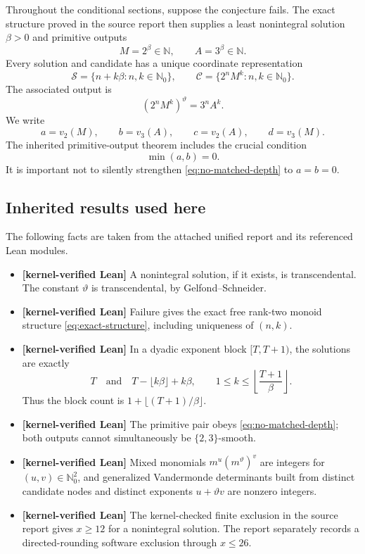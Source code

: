 \documentclass[11pt,oneside]{article}
\theoremstyle{definition}
\theoremstyle{remark}
\newcommand{\N}{\mathbb N}
\newcommand{\Nzero}{\mathbb N_0}
\newcommand{\Sol}{\mathcal S}
\newcommand{\Cand}{\mathcal C}
\newcommand{\statuslean}{\textcolor{leanblue}{\textbf{[kernel-verified Lean]}}}
\begin{document}
Throughout the conditional sections, suppose the conjecture fails.  The exact structure
proved in the source report then supplies a least nonintegral solution $\beta>0$ and primitive
outputs
\[
  M=2^\beta\in\N,
  \qquad
  A=3^\beta\in\N.
\]
Every solution and candidate has a unique coordinate representation
\begin{equation}\label{eq:exact-structure}
  \Sol=\{n+k\beta:n,k\in\Nzero\},
  \qquad
  \Cand=\{2^nM^k:n,k\in\Nzero\}.
\end{equation}
The associated output is
\[
  (2^nM^k)^\vartheta=3^nA^k.
\]
We write
\[
  a=v_2(M),\qquad b=v_3(A),\qquad c=v_2(A),\qquad d=v_3(M).
\]
The inherited primitive-output theorem includes the crucial condition
\begin{equation}\label{eq:no-matched-depth}
  \min(a,b)=0.
\end{equation}
It is important not to silently strengthen \eqref{eq:no-matched-depth} to $a=b=0$.

\subsection{Inherited results used here}

The following facts are taken from the attached unified report and its referenced Lean
modules.

\begin{itemize}
\item \statuslean{} A nonintegral solution, if it exists, is transcendental.  The constant
      $\vartheta$ is transcendental, by Gelfond--Schneider.
\item \statuslean{} Failure gives the exact free rank-two monoid structure
      \eqref{eq:exact-structure}, including uniqueness of $(n,k)$.
\item \statuslean{} In a dyadic exponent block $[T,T+1)$, the solutions are exactly
      \[
        T
        \quad\text{and}\quad
        T-\lfloor k\beta\rfloor+k\beta,
        \qquad 1\le k\le\left\lfloor\frac{T+1}{\beta}\right\rfloor.
      \]
      Thus the block count is $1+\lfloor(T+1)/\beta\rfloor$.
\item \statuslean{} The primitive pair obeys \eqref{eq:no-matched-depth}; both outputs cannot
      simultaneously be $\{2,3\}$-smooth.
\item \statuslean{} Mixed monomials $m^u(m^\vartheta)^v$ are integers for
      $(u,v)\in\Nzero^2$, and generalized Vandermonde determinants built from distinct
      candidate nodes and distinct exponents $u+\vartheta v$ are nonzero integers.
\item \statuslean{} The kernel-checked finite exclusion in the source report gives
      $x\ge12$ for a nonintegral solution.  The report separately records a directed-rounding
      software exclusion through $x\le26$.
\end{itemize}
\end{document}
